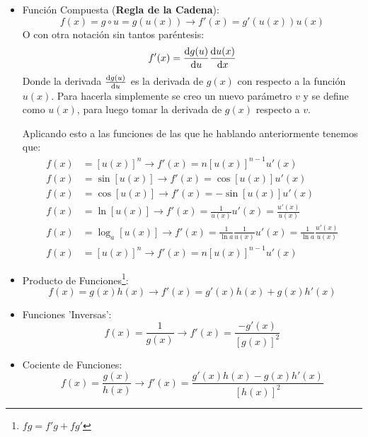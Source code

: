 \documentclass[arial,a4paper,print]{article}
\begin{document}
\begin{itemize}
\item Función Compuesta (\textbf{Regla de la Cadena}):\\
\begin{equation*}
	f(x) = g\circ u = g(u(x)) \rightarrow f'(x) = g'(u(x))u(x)
\end{equation*}
O con otra notación sin tantos paréntesis:
\begin{equation*}
	f'(x) = \dv{g(u)}{u}\dv{u(x)}{x}
\end{equation*}
Donde la derivada $\dv{g(u)}{u}$ es la derivada de $g(x)$ con respecto a la función $u(x)$. Para hacerla simplemente se creo un nuevo parámetro $v$ y se define como $u(x)$, para luego tomar la derivada de $g(x)$ respecto a $v$. 

Aplicando esto a las funciones de las que he hablando anteriormente tenemos que:
\begin{align*}
	f(x) &= [u(x)]^{n} \rightarrow f'(x) = n[u(x)]^{n-1}u'(x) \\
	f(x) &= \sin[u(x)] \rightarrow f'(x) = \cos[u(x)]u'(x) \\
	f(x) &= \cos[u(x)] \rightarrow f'(x) = -\sin[u(x)]u'(x) \\
	f(x) &= \ln[u(x)] \rightarrow f'(x) = \frac{1}{u(x)} u'(x) = \frac{u'(x)}{u(x)} \\
	f(x) &= \log_a [u(x)] \rightarrow f'(x) = \frac{1}{\ln a} \frac{1}{u(x)} u'(x) = \frac{1}{\ln a}\frac{u'(x)}{u(x)} \\
	f(x) &= [u(x)]^{n} \rightarrow f'(x) = n[u(x)]^{n-1}u'(x)
\end{align*}

\pagebreak
\item Producto de Funciones\footnote{$fg = f'g + fg'$}:\\
\begin{equation*}
	f(x) = g(x)h(x) \rightarrow f'(x) = g'(x)h(x) + g(x)h'(x)
\end{equation*}

\item Funciones 'Inversas':\\
\begin{equation*}
	f(x) = \frac{1}{g(x)} \rightarrow f'(x) = \frac{-g'(x)}{[g(x)]^{2}}
\end{equation*}

\item Cociente de Funciones:\\
\begin{equation*}
	f(x) = \frac{g(x)}{h(x)} \rightarrow f'(x) = \frac{g'(x)h(x) - g(x)h'(x)}{[h(x)]^{2}}
\end{equation*}


\end{itemize}
\end{document}
